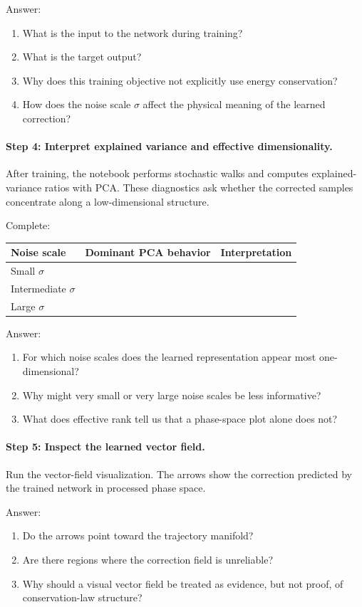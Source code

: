 \documentclass[11pt]{article}
\begin{document}
Answer:
\begin{enumerate}
    \item What is the input to the network during training?
    \item What is the target output?
    \item Why does this training objective not explicitly use energy conservation?
    \item How does the noise scale \(\sigma\) affect the physical meaning of the learned correction?
\end{enumerate}

\paragraph{Step 4: Interpret explained variance and effective dimensionality.}
After training, the notebook performs stochastic walks and computes explained-variance ratios with PCA. These diagnostics ask whether the corrected samples concentrate along a low-dimensional structure.

Complete:
\begin{center}
\begin{tabular}{l l l}
\hline
Noise scale & Dominant PCA behavior & Interpretation \\
\hline
Small \(\sigma\) & & \\
Intermediate \(\sigma\) & & \\
Large \(\sigma\) & & \\
\hline
\end{tabular}
\end{center}

Answer:
\begin{enumerate}
    \item For which noise scales does the learned representation appear most one-dimensional?
    \item Why might very small or very large noise scales be less informative?
    \item What does effective rank tell us that a phase-space plot alone does not?
\end{enumerate}

\paragraph{Step 5: Inspect the learned vector field.}
Run the vector-field visualization. The arrows show the correction predicted by the trained network in processed phase space.

Answer:
\begin{enumerate}
    \item Do the arrows point toward the trajectory manifold?
    \item Are there regions where the correction field is unreliable?
    \item Why should a visual vector field be treated as evidence, but not proof, of conservation-law structure?
\end{enumerate}
\end{document}
